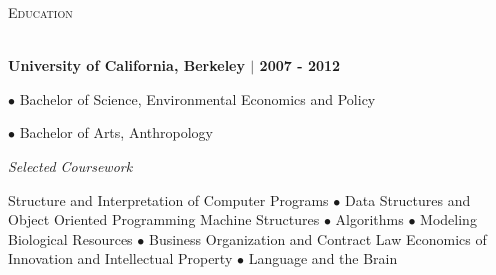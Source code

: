 \documentclass{article}
\newcommand{\lineunder}{\vspace*{-8pt} \\ \hspace*{-18pt} \hrulefill \\}
\newcommand{\header}[1]{{\hspace*{-15pt}\vspace*{6pt} \textsc{#1}} \vspace*{-6pt} \lineunder}
\begin{document}
\header{Education}
\begin{description}
 \item \textbf{University of California, Berkeley $|$ 2007 - 2012}
 \item$\bullet$ Bachelor of Science, Environmental Economics and Policy
 \item$\bullet$ Bachelor of Arts, Anthropology
 \begin{center}
\textit{Selected Coursework}
 \item {Structure and Interpretation of Computer Programs} $\bullet$ {Data Structures and Object Oriented Programming}
 {Machine Structures} $\bullet$ {Algorithms} $\bullet$ {Modeling Biological Resources} $\bullet$ {Business Organization and Contract Law}
 {Economics of Innovation and Intellectual Property} $\bullet$ {Language and the Brain}
 
 \end{center}
 
\end{description}
\end{document}
